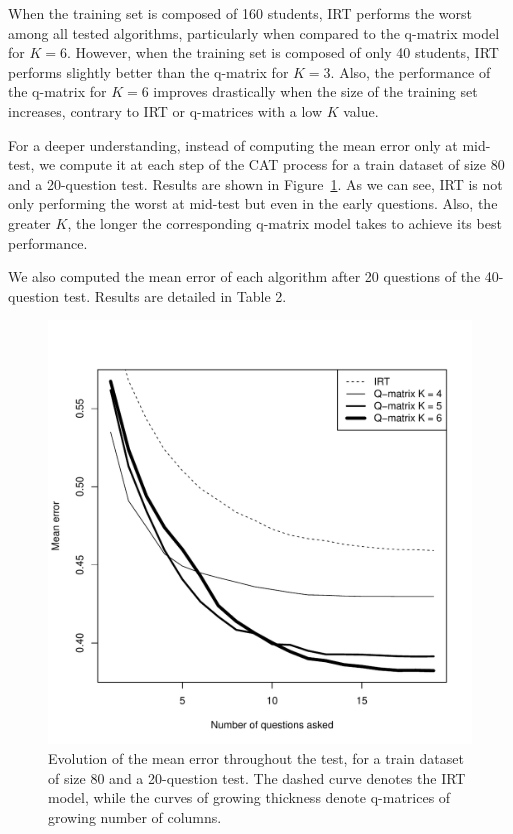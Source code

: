 \documentclass{sig-alternate}
\begin{document}
When the training set is composed of 160 students, IRT performs the worst among all tested algorithms, particularly when compared to the q-matrix model for $K = 6$. However, when the training set is composed of only 40 students, IRT performs slightly better than the q-matrix for $K = 3$. Also, the performance of the q-matrix for $K = 6$ improves drastically when the size of the training set increases, contrary to IRT or q-matrices with a low $K$ value.

For a deeper understanding, instead of computing the mean error only at mid-test, we compute it at each step of the CAT process for a train dataset of size 80 and a 20-question test. Results are shown in Figure~\ref{fig:1}. As we can see, IRT is not only performing the worst at mid-test but even in the early questions. Also, the greater $K$, the longer the corresponding q-matrix model takes to achieve its best performance.

We also computed the mean error of each algorithm after 20 questions of the 40-question test. Results are detailed in Table 2.

\begin{figure}
\includegraphics[width=\linewidth]{20-80.pdf}
\caption{Evolution of the mean error throughout the test, for a train dataset of size 80 and a 20-question test. The dashed curve denotes the IRT model, while the curves of growing thickness denote q-matrices of growing number of columns.}
\label{fig:1}
\end{figure}
\end{document}
